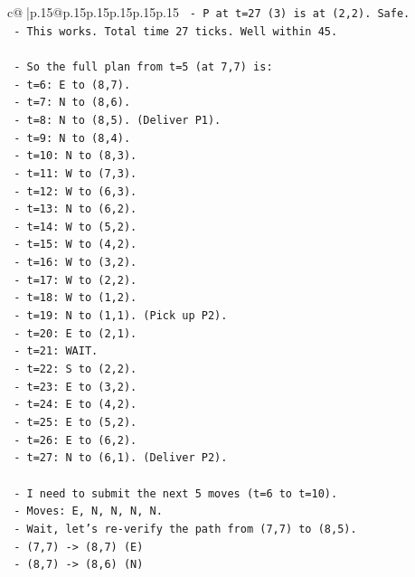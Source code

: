 \documentclass{article}
\begin{document}
{\begin{supertabular}{c@{$\;$}|p{.15\linewidth}@{}p{.15\linewidth}p{.15\linewidth}p{.15\linewidth}p{.15\linewidth}p{.15\linewidth}}
{{{\texttt{        {-} P at t=27 (3) is at (2,2). Safe.} \\
\texttt{      {-} This works. Total time 27 ticks. Well within 45.} \\
\\ 
\texttt{  {-} So the full plan from t=5 (at 7,7) is:} \\
\texttt{    {-} t=6: E to (8,7).} \\
\texttt{    {-} t=7: N to (8,6).} \\
\texttt{    {-} t=8: N to (8,5). (Deliver P1).} \\
\texttt{    {-} t=9: N to (8,4).} \\
\texttt{    {-} t=10: N to (8,3).} \\
\texttt{    {-} t=11: W to (7,3).} \\
\texttt{    {-} t=12: W to (6,3).} \\
\texttt{    {-} t=13: N to (6,2).} \\
\texttt{    {-} t=14: W to (5,2).} \\
\texttt{    {-} t=15: W to (4,2).} \\
\texttt{    {-} t=16: W to (3,2).} \\
\texttt{    {-} t=17: W to (2,2).} \\
\texttt{    {-} t=18: W to (1,2).} \\
\texttt{    {-} t=19: N to (1,1). (Pick up P2).} \\
\texttt{    {-} t=20: E to (2,1).} \\
\texttt{    {-} t=21: WAIT.} \\
\texttt{    {-} t=22: S to (2,2).} \\
\texttt{    {-} t=23: E to (3,2).} \\
\texttt{    {-} t=24: E to (4,2).} \\
\texttt{    {-} t=25: E to (5,2).} \\
\texttt{    {-} t=26: E to (6,2).} \\
\texttt{    {-} t=27: N to (6,1). (Deliver P2).} \\
\\ 
\texttt{  {-} I need to submit the next 5 moves (t=6 to t=10).} \\
\texttt{  {-} Moves: E, N, N, N, N.} \\
\texttt{  {-} Wait, let's re{-}verify the path from (7,7) to (8,5).} \\
\texttt{    {-} (7,7) {-}> (8,7) (E)} \\
\texttt{    {-} (8,7) {-}> (8,6) (N)} \\
}}}
\end{supertabular}}
\end{document}
